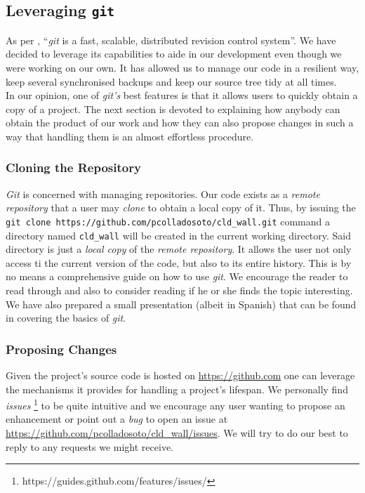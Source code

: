         \subsection{Leveraging \texttt{git}}
            As per \cite{bib:man-git}, ``\textit{git} is a fast, scalable, distributed revision control system''. We have decided to leverage its capabilities to aide in our development even though we were working on our own. It has allowed us to manage our code in a resilient way, keep several synchronised backups and keep our source tree tidy at all times.\\

            In our opinion, one of \textit{git's} best features is that it allows users to quickly obtain a copy of a project. The next section is devoted to explaining how anybody can obtain the product of our work and how they can also propose changes in such a way that handling them is an almost effortless procedure.\\

            \subsubsection{Cloning the Repository}
                \textit{Git} is concerned with managing repositories. Our code exists as a \textit{remote repository} that a user may \textit{clone} to obtain a local copy of it. Thus, by issuing the \texttt{git clone https://github.com/pcolladosoto/cld\_wall.git} command a directory named \texttt{cld\_wall} will be created in the current working directory. Said directory is just a \textit{local copy} of the \textit{remote repository}. It allows the user not only access ti the current version of the code, but also to its entire history. This is by no means a comprehensive guide on how to use \textit{git}. We encourage the reader to read through \cite{bib:man-git} and also to consider reading \cite{bib:pro-git} if he or she finds the topic interesting. We have also prepared a small presentation (albeit in Spanish) that can be found in \cite{bib:git-talk} covering the basics of \textit{git}.\\

            \subsubsection{Proposing Changes}
                Given the project's source code is hosted on \url{https://github.com} one can leverage the mechanisms it provides for handling a project's lifespan. We personally find \textit{issues} \footnote{https://guides.github.com/features/issues/} to be quite intuitive and we encourage any user wanting to propose an enhancement or point out a \textit{bug} to open an issue at \url{https://github.com/pcolladosoto/cld\_wall/issues}. We will try to do our best to reply to any requests we might receive.\\


